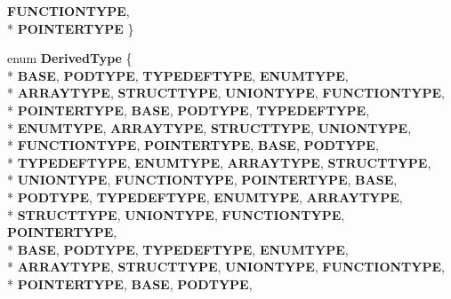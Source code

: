 \begin{DoxyCompactItemize}
{\bfseries F\-U\-N\-C\-T\-I\-O\-N\-T\-Y\-P\-E}, 
\\*
{\bfseries P\-O\-I\-N\-T\-E\-R\-T\-Y\-P\-E}
 \}
\item 
enum {\bfseries Derived\-Type} \{ \\*
{\bfseries B\-A\-S\-E}, 
{\bfseries P\-O\-D\-T\-Y\-P\-E}, 
{\bfseries T\-Y\-P\-E\-D\-E\-F\-T\-Y\-P\-E}, 
{\bfseries E\-N\-U\-M\-T\-Y\-P\-E}, 
\\*
{\bfseries A\-R\-R\-A\-Y\-T\-Y\-P\-E}, 
{\bfseries S\-T\-R\-U\-C\-T\-T\-Y\-P\-E}, 
{\bfseries U\-N\-I\-O\-N\-T\-Y\-P\-E}, 
{\bfseries F\-U\-N\-C\-T\-I\-O\-N\-T\-Y\-P\-E}, 
\\*
{\bfseries P\-O\-I\-N\-T\-E\-R\-T\-Y\-P\-E}, 
{\bfseries B\-A\-S\-E}, 
{\bfseries P\-O\-D\-T\-Y\-P\-E}, 
{\bfseries T\-Y\-P\-E\-D\-E\-F\-T\-Y\-P\-E}, 
\\*
{\bfseries E\-N\-U\-M\-T\-Y\-P\-E}, 
{\bfseries A\-R\-R\-A\-Y\-T\-Y\-P\-E}, 
{\bfseries S\-T\-R\-U\-C\-T\-T\-Y\-P\-E}, 
{\bfseries U\-N\-I\-O\-N\-T\-Y\-P\-E}, 
\\*
{\bfseries F\-U\-N\-C\-T\-I\-O\-N\-T\-Y\-P\-E}, 
{\bfseries P\-O\-I\-N\-T\-E\-R\-T\-Y\-P\-E}, 
{\bfseries B\-A\-S\-E}, 
{\bfseries P\-O\-D\-T\-Y\-P\-E}, 
\\*
{\bfseries T\-Y\-P\-E\-D\-E\-F\-T\-Y\-P\-E}, 
{\bfseries E\-N\-U\-M\-T\-Y\-P\-E}, 
{\bfseries A\-R\-R\-A\-Y\-T\-Y\-P\-E}, 
{\bfseries S\-T\-R\-U\-C\-T\-T\-Y\-P\-E}, 
\\*
{\bfseries U\-N\-I\-O\-N\-T\-Y\-P\-E}, 
{\bfseries F\-U\-N\-C\-T\-I\-O\-N\-T\-Y\-P\-E}, 
{\bfseries P\-O\-I\-N\-T\-E\-R\-T\-Y\-P\-E}, 
{\bfseries B\-A\-S\-E}, 
\\*
{\bfseries P\-O\-D\-T\-Y\-P\-E}, 
{\bfseries T\-Y\-P\-E\-D\-E\-F\-T\-Y\-P\-E}, 
{\bfseries E\-N\-U\-M\-T\-Y\-P\-E}, 
{\bfseries A\-R\-R\-A\-Y\-T\-Y\-P\-E}, 
\\*
{\bfseries S\-T\-R\-U\-C\-T\-T\-Y\-P\-E}, 
{\bfseries U\-N\-I\-O\-N\-T\-Y\-P\-E}, 
{\bfseries F\-U\-N\-C\-T\-I\-O\-N\-T\-Y\-P\-E}, 
{\bfseries P\-O\-I\-N\-T\-E\-R\-T\-Y\-P\-E}, 
\\*
{\bfseries B\-A\-S\-E}, 
{\bfseries P\-O\-D\-T\-Y\-P\-E}, 
{\bfseries T\-Y\-P\-E\-D\-E\-F\-T\-Y\-P\-E}, 
{\bfseries E\-N\-U\-M\-T\-Y\-P\-E}, 
\\*
{\bfseries A\-R\-R\-A\-Y\-T\-Y\-P\-E}, 
{\bfseries S\-T\-R\-U\-C\-T\-T\-Y\-P\-E}, 
{\bfseries U\-N\-I\-O\-N\-T\-Y\-P\-E}, 
{\bfseries F\-U\-N\-C\-T\-I\-O\-N\-T\-Y\-P\-E}, 
\\*
{\bfseries P\-O\-I\-N\-T\-E\-R\-T\-Y\-P\-E}, 
{\bfseries B\-A\-S\-E}, 
{\bfseries P\-O\-D\-T\-Y\-P\-E}, 

\end{DoxyCompactItemize}
